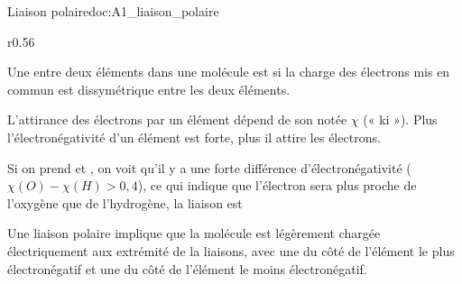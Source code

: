 \begin{doc}{Liaison polaire}{doc:A1_liaison_polaire}
  \begin{wrapfigure}[6]{r}{0.56\linewidth}
    \centering
    \vspace*{-20pt}
    
  \end{wrapfigure}
  \phantom{b}\vspace*{-20pt}
    
  \begin{encart}
    Une  entre deux éléments dans une molécule est  si la charge des électrons mis en commun est dissymétrique entre les deux éléments.
  \end{encart}
  L'attirance des électrons par un élément dépend de son  notée $\chi$ (« ki »).
  Plus l'électronégativité d'un élément est forte, plus il attire les électrons.

  Si on prend  et , on voit qu'il y a une forte différence d'électronégativité ($\chi(O) - \chi(H) > 0,4$), ce qui indique que l'électron sera plus proche de l'oxygène que de l'hydrogène, la liaison  est 

  \begin{encart}  
    Une liaison polaire implique que la molécule est légèrement chargée électriquement aux extrémité de la liaisons, avec une  du côté de l'élément le plus électronégatif et une  du côté de l'élément le moins électronégatif.
  \end{encart}
\end{doc}


